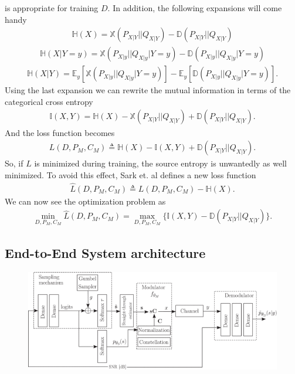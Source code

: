 is appropriate for training $D$. In addition, the following expansions will come handy
\begin{align}
	\mathbb{H}(X) = \mathbb{X}(P_{X|Y}||Q_{X|Y}) - \mathbb{D}(P_{X|Y}||Q_{X|Y})
\end{align}
\begin{align}
	\mathbb{H}(X|Y=y) = \mathbb{X}(P_{X|y}||Q_{X|y}|Y=y) - \mathbb{D}(P_{X|y}||Q_{X|y}|Y=y)
\end{align}
\begin{align}
	\mathbb{H}(X|Y) = \mathbb{E}_y\left[\mathbb{X}(P_{X|y}||Q_{X|y}|Y=y)\right] - \mathbb{E}_y \left[\mathbb{D}(P_{X|y}||Q_{X|y}|Y=y)\right].
\end{align}
Using the last expansion we can rewrite the mutual information in terms of the categorical cross entropy
\begin{align}
	\mathbb{I} \left(X , Y\right) = \mathbb{H}(X) - \mathbb{X}(P_{X|Y}||Q_{X|Y}) + \mathbb{D}(P_{X|Y}||Q_{X|Y}).
\end{align}
And the loss function becomes 
\begin{align}
	L(D, P_M, C_M) \triangleq \mathbb{H}(X) - \mathbb{I} \left(X , Y\right) + \mathbb{D}(P_{X|Y}||Q_{X|Y}).
\end{align}
So, if $L$ is minimized during training, the source entropy is unwantedly as well minimized. To avoid this effect, Sark et. al defines a new loss function
\begin{align}
	\hat{L}(D, P_M, C_M) \triangleq L(D, P_M, C_M) - \mathbb{H}(X).
\end{align}
We can now see the optimization problem as
\begin{align}
	\min_{D, P_M, C_M}\hat{L}(D, P_M, C_M) = \max_{D, P_M, C_M} \{ \mathbb{I} \left(X , Y\right) - \mathbb{D}(P_{X|Y}||Q_{X|Y})\}.
\end{align}

\subsection{End-to-End System architecture}
\begin{figure}[h!]
\includegraphics[width=\textwidth]{figs/stark_diagram.png}
\centering
\end{figure}

